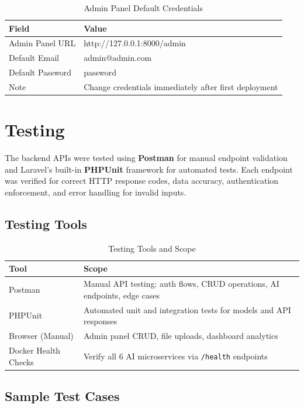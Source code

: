 \begin{table}[H]
\centering
\caption{Admin Panel Default Credentials}
\begin{tabularx}{\textwidth}{|l|X|}
\hline
\textbf{Field} & \textbf{Value} \\
\hline
Admin Panel URL   & http://127.0.0.1:8000/admin \\
\hline
Default Email     & admin@admin.com \\
\hline
Default Password  & password \\
\hline
Note & Change credentials immediately after first deployment \\
\hline
\end{tabularx}
\end{table}

\section{Testing}
\label{sec:ch4testing}

The backend APIs were tested using \textbf{Postman} for manual endpoint
validation and Laravel's built-in \textbf{PHPUnit} framework for automated
tests. Each endpoint was verified for correct HTTP response codes, data
accuracy, authentication enforcement, and error handling for invalid inputs.

\subsection{Testing Tools}

\begin{table}[H]
\centering
\caption{Testing Tools and Scope}
\begin{tabularx}{\textwidth}{|l|X|}
\hline
\textbf{Tool} & \textbf{Scope} \\
\hline
Postman           & Manual API testing: auth flows, CRUD operations, AI endpoints, edge cases \\
\hline
PHPUnit           & Automated unit and integration tests for models and API responses \\
\hline
Browser (Manual)  & Admin panel CRUD, file uploads, dashboard analytics \\
\hline
Docker Health Checks & Verify all 6 AI microservices via \texttt{/health} endpoints \\
\hline
\end{tabularx}
\end{table}

\subsection{Sample Test Cases}

